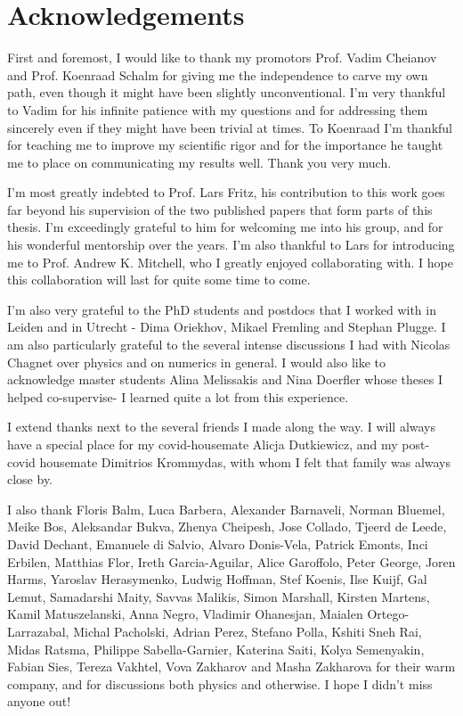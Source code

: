 \newpage
\thispagestyle{empty}

\chapter*{Acknowledgements}
\label{Acknowledgements}

First and foremost, I would like to thank my promotors Prof. Vadim Cheianov and Prof. Koenraad Schalm for giving me the independence to carve my own path, even though it might have been slightly unconventional. I'm very thankful to Vadim for his infinite patience with my questions and for addressing them sincerely even if they might have been trivial at times. To Koenraad I'm thankful for teaching me to improve my scientific rigor and for the importance he taught me to place on communicating my results well. Thank you very much. 
\par
I'm most greatly indebted to Prof. Lars Fritz, his contribution to this work goes far beyond his supervision of the two published papers that form parts of this thesis. I'm exceedingly grateful to him for welcoming me into his group, and for his wonderful mentorship over the years. I'm also thankful to Lars for introducing me to Prof. Andrew K. Mitchell, who I greatly enjoyed collaborating with. I hope this collaboration will last for quite some time to come. 
\par
I'm also very grateful to the PhD students and postdocs that I worked with in Leiden and in Utrecht - Dima Oriekhov, Mikael Fremling and Stephan Plugge. I am also particularly grateful to the several intense discussions I had with Nicolas Chagnet over physics and on numerics in general. I would also like to acknowledge master students Alina Melissakis and Nina Doerfler whose theses I helped co-supervise- I learned quite a lot from this experience.
\par
I extend thanks next to the several friends I made along the way. I will always have a special place for my covid-housemate Alicja Dutkiewicz, and my post-covid housemate Dimitrios Krommydas, with whom I felt that family was always close by. 
\par
I also thank Floris Balm, Luca Barbera, Alexander Barnaveli, Norman Bluemel,  Meike Bos, Aleksandar Bukva, Zhenya Cheipesh, Jose Collado, Tjeerd de Leede, David Dechant, Emanuele di Salvio, Alvaro Donis-Vela, Patrick Emonts, Inci Erbilen, Matthias Flor, Ireth Garcia-Aguilar, Alice Garoffolo, Peter George, Joren Harms, Yaroslav Herasymenko, Ludwig Hoffman, Stef Koenis, Ilse Kuijf, Gal Lemut, Samadarshi Maity, Savvas Malikis, Simon Marshall, Kirsten Martens, Kamil Matuszelanski, Anna Negro, Vladimir Ohanesjan, Maialen Ortego-Larrazabal, Michal Pacholski, Adrian Perez, Stefano Polla, Kshiti Sneh Rai, Midas Ratsma, Philippe Sabella-Garnier, Katerina Saiti, Kolya Semenyakin, Fabian Sies, Tereza Vakhtel, Vova Zakharov and Masha Zakharova for their warm company, and for discussions both physics and otherwise. I hope I didn't miss anyone out! 
